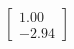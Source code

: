 \documentclass[preview]{standalone}
\begin{document}
\begin{align*}
\begin{bmatrix} 1.00 \\ -2.94 \end{bmatrix}
\end{align*}
\end{document}
